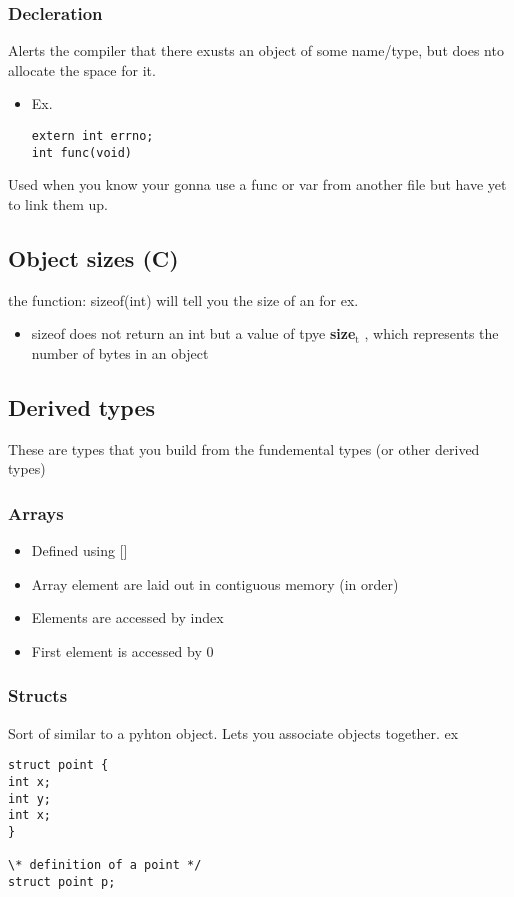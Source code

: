 \documentclass[11pt]{article}
\begin{document}
\subsubsection{\textbf{Decleration}}
\label{sec-2-6-4}
Alerts the compiler that there exusts an object of some name/type, but does nto allocate the space for it.
\begin{itemize}
\item Ex.
\begin{verbatim}
extern int errno;
int func(void)
\end{verbatim}
\end{itemize}
Used when you know your gonna use a func or var from another file but have yet to link them up.
\subsection{Object sizes (C)}
\label{sec-2-7}
the function: sizeof(int) will tell you the size of an for ex.
\begin{itemize}
\item sizeof does not return an int but a value of tpye \textbf{size$_{\text{t}}$} , which represents the number of bytes in an object
\end{itemize}
\subsection{Derived types}
\label{sec-2-8}
These are types that you build from the fundemental types (or other derived types)
\subsubsection{\textbf{Arrays}}
\label{sec-2-8-1}
\begin{itemize}
\item Defined using []
\item Array element are laid out in contiguous memory (in order)
\item Elements are accessed by index
\item First element is accessed by 0
\end{itemize}
\subsubsection{\textbf{Structs}}
\label{sec-2-8-2}
Sort of similar to a pyhton object. Lets you associate objects together.
ex
\begin{verbatim}
struct point {
int x;
int y;
int x;
}

\* definition of a point */
struct point p;
\end{verbatim}
\end{document}
